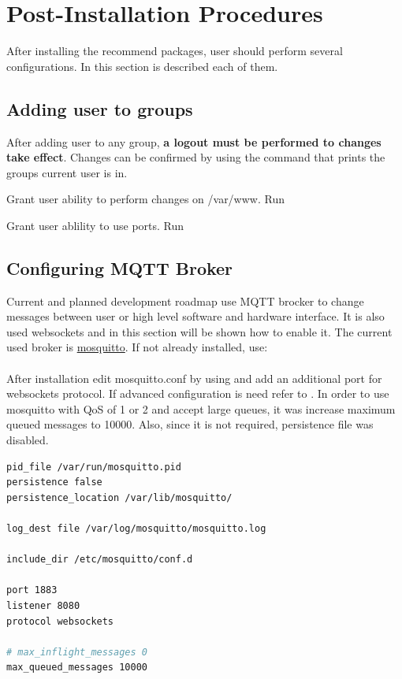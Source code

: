 \section{Post-Installation Procedures}
After installing the recommend packages, user should perform several configurations. In this section is described each of them.

\subsection{Adding user to groups}
After adding user to any group, \textbf{a logout must be performed to changes take effect}. Changes can be confirmed by using the command  that prints the groups current user is in.
\begin{description}[style=nextline]
	\item[www-data] Grant user ability to perform changes on /var/www. Run 
	\item[dialout] Grant user ablility to use ports. Run 
\end{description}

\subsection{Configuring MQTT Broker}
Current and planned development roadmap use \gls{MQTT} brocker to change messages between user or high level software and hardware interface. It is also used websockets and in this section will be shown how to enable it. The current used broker is \href{https://mosquitto.org/}{mosquitto}. If not already installed, use:\\  \\
After installation edit mosquitto.conf by using  and add an additional port for websockets protocol. If advanced configuration is need refer to \cite{mosquitto_conf}. In order to use mosquitto with \gls{QoS} of 1 or 2 and accept large queues, it was increase maximum queued messages to 10000. Also, since it is not required, persistence file was disabled.

\begin{lstlisting}[frame=none,language=bash,backgroundcolor=\color{gray!15},numbers=none,		basicstyle=\ttfamily]
pid_file /var/run/mosquitto.pid
persistence false
persistence_location /var/lib/mosquitto/

log_dest file /var/log/mosquitto/mosquitto.log

include_dir /etc/mosquitto/conf.d

port 1883
listener 8080
protocol websockets

# max_inflight_messages 0
max_queued_messages 10000 
\end{lstlisting}

